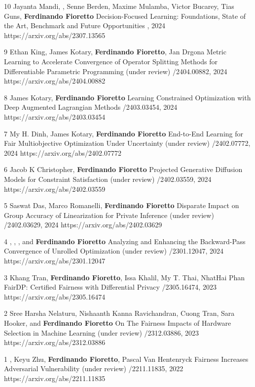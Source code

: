 \begin{pubs}

\wsentry
	{10}
	{Jayanta Mandi, , Senne Berden, Maxime Mulamba, Victor Bucarey, Tias Guns, {\bf Ferdinando Fioretto}} 
	{Decision-Focused Learning: Foundations, State of the Art, Benchmark and Future Opportunities}
	{, 2024}
	{https://arxiv.org/abs/2307.13565}

\wsentry
	{9}
	{Ethan King, \student{} James Kotary, {\bf Ferdinando Fioretto}, Jan Drgona}
	{Metric Learning to Accelerate Convergence of Operator Splitting Methods for Differentiable Parametric Programming}
	{(under review) /2404.00882, 2024}
	{https://arxiv.org/abs/2404.00882}

\wsentry
	{8}
	{\student{} James Kotary, {\bf Ferdinando Fioretto}}
	{Learning Constrained Optimization with Deep Augmented Lagrangian Methods}
	{/2403.03454, 2024}
	{https://arxiv.org/abs/2403.03454}

\wsentry
	{7}
	{\student{}My H. Dinh, \student{} James Kotary, {\bf Ferdinando Fioretto}}
	{End-to-End Learning for Fair Multiobjective Optimization Under Uncertainty}
	{(under review) /2402.07772, 2024}
	{https://arxiv.org/abs/2402.07772}

\wsentry
	{6}
	{\student{} Jacob K Christopher, {\bf Ferdinando Fioretto}}
  	{Projected Generative Diffusion Models for Constraint Satisfaction}
	{(under review) /2402.03559, 2024}
	{https://arxiv.org/abs/2402.03559}

\wsentry
	{5}
	{\student{} Saswat Das, Marco Romanelli, {\bf Ferdinando Fioretto}}
	{Disparate Impact on Group Accuracy of Linearization for Private Inference}
	{(under review) /2402.03629, 2024}
	{https://arxiv.org/abs/2402.03629}

\wsentry
	{4}
	{, , ,
	and {\bf Ferdinando Fioretto}}
	{Analyzing and Enhancing the Backward-Pass Convergence of Unrolled Optimization}	
	{(under review) /2301.12047, 2024}
	{https://arxiv.org/abs/2301.12047}

\wsentry
	{3}
	{Khang Tran, {\bf Ferdinando Fioretto}, Issa Khalil, My T. Thai, NhatHai Phan} 
	{FairDP: Certified Fairness with Differential Privacy}
	{/2305.16474, 2023}
	{https://arxiv.org/abs/2305.16474}

\wsentry
	{2}
	{\student{} Sree Harsha Nelaturu, \student{} Nishaanth Kanna Ravichandran, \student{} Cuong Tran, Sara Hooker, and {\bf Ferdinando Fioretto}}
	{On The Fairness Impacts of Hardware Selection in Machine Learning}	
	{(under review) /2312.03886, 2023}
	{https://arxiv.org/abs/2312.03886}


\wsentry 
	{1}%
	{, Keyu Zhu, {\bf Ferdinando Fioretto}, Pascal Van Hentenryck}
	{Fairness Increases Adversarial Vulnerability}
	{(under review) /2211.11835, 2022}
	{https://arxiv.org/abs/2211.11835}

\end{pubs}

